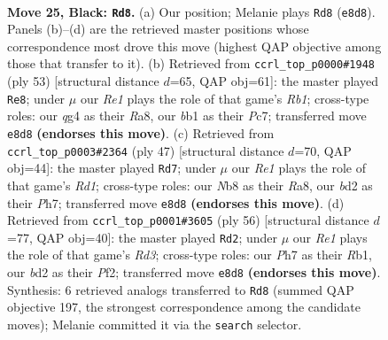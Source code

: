 \documentclass[11pt]{article}
\begin{document}
\clearpage

\begin{figure}[p]\centering
\begin{subfigure}{0.46\textwidth}\centering
\resizebox{\linewidth}{!}{%
\newchessgame
\chessboard[
  setfen={rn2r1k1/pp2qppp/8/2P1P3/6Q1/P5P1/1P1B1P2/1BR1R1K1 b - - 0 25},
  showmover=false,
  pgfstyle=straightmove, color=movearrow, markmove={e8-d8}
]}
\caption{}
\end{subfigure}\hfill
\begin{subfigure}{0.46\textwidth}\centering
\resizebox{\linewidth}{!}{%
\newchessgame
\chessboard[
  setfen={rr5k/1pp3pp/3q4/p2bpQ2/P6P/2B1P1P1/5P2/R1R3K1 b - - 0 27},
  showmover=false,
  pgfstyle=straightmove, color=movearrow, markmove={b8-e8}
]}
\caption{}
\end{subfigure}
\\[4pt]
\begin{subfigure}{0.46\textwidth}\centering
\resizebox{\linewidth}{!}{%
\newchessgame
\chessboard[
  setfen={r2r2k1/1pp3pp/1n2q3/p3Pp2/P7/7P/1PQB1PP1/R3R1K1 b - - 0 24},
  showmover=false,
  pgfstyle=straightmove, color=movearrow, markmove={d8-d7}
]}
\caption{}
\end{subfigure}\hfill
\begin{subfigure}{0.46\textwidth}\centering
\resizebox{\linewidth}{!}{%
\newchessgame
\chessboard[
  setfen={r4rk1/q2p3p/n1bNpppP/8/2P1P3/Q2R2P1/5PB1/1R4K1 w - - 1 29},
  showmover=false,
  pgfstyle=straightmove, color=movearrow, markmove={d3-d2}
]}
\caption{}
\end{subfigure}
\caption{\textbf{Move 25, Black: \texttt{Rd8}.} (a) Our position; Melanie plays \texttt{Rd8} (\texttt{e8d8}). Panels (b)--(d) are the retrieved master positions whose correspondence most drove this move (highest QAP objective among those that transfer to it). (b) Retrieved from \texttt{ccrl\_top\_p0000\#1948} (ply 53) [structural distance $d$=65, QAP obj=61]: the master played \texttt{Re8}; under $\mu$ our \emph{Re1} plays the role of that game's \emph{Rb1}; cross-type roles: our \emph{q}g4 as their \emph{R}a8, our \emph{b}b1 as their \emph{P}c7; transferred move \texttt{e8d8} \textbf{(endorses this move)}. (c) Retrieved from \texttt{ccrl\_top\_p0003\#2364} (ply 47) [structural distance $d$=70, QAP obj=44]: the master played \texttt{Rd7}; under $\mu$ our \emph{Re1} plays the role of that game's \emph{Rd1}; cross-type roles: our \emph{N}b8 as their \emph{R}a8, our \emph{b}d2 as their \emph{P}h7; transferred move \texttt{e8d8} \textbf{(endorses this move)}. (d) Retrieved from \texttt{ccrl\_top\_p0001\#3605} (ply 56) [structural distance $d$=77, QAP obj=40]: the master played \texttt{Rd2}; under $\mu$ our \emph{Re1} plays the role of that game's \emph{Rd3}; cross-type roles: our \emph{P}h7 as their \emph{R}b1, our \emph{b}d2 as their \emph{P}f2; transferred move \texttt{e8d8} \textbf{(endorses this move)}. Synthesis: 6 retrieved analogs transferred to \texttt{Rd8} (summed QAP objective 197, the strongest correspondence among the candidate moves); Melanie committed it via the \texttt{search} selector.}
\label{fig:thought-m49}
\end{figure}
\end{document}
